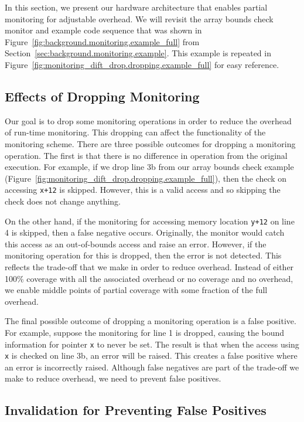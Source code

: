In this section, we present our hardware architecture that enables partial
monitoring for adjustable overhead. We will revisit the array bounds check
monitor and example code sequence that was shown in
Figure~\ref{fig:background.monitoring.example_full} from
Section~\ref{sec:background.monitoring.example}. This example is repeated
in Figure~\ref{fig:monitoring_dift_drop.dropping.example_full} for easy
reference.

\subsection{Effects of Dropping Monitoring}
\label{sec:monitoring_dift_drop.dropping.false_neg_pos}

Our goal is to drop some monitoring operations in order to reduce the overhead
of run-time monitoring. This dropping can affect the functionality of the
monitoring scheme. There are three possible outcomes for dropping a monitoring
operation. The first is that there is no difference in operation from the
original execution. For example, if we drop line 3b from our array bounds check
example (Figure~\ref{fig:monitoring_dift_drop.dropping.example_full}), then the
check on accessing {\tt x+12} is skipped. However, this is a valid access and
so skipping the check does not change anything.

On the other hand, if the monitoring for accessing memory location {\tt y+12}
on line 4 is skipped, then a false negative occurs. Originally, the monitor
would catch this access as an out-of-bounds access and raise an error. However,
if the monitoring operation for this is dropped, then the error is not
detected. This reflects the trade-off that we make in order to reduce overhead.
Instead of either 100\% coverage with all the associated overhead or no
coverage and no overhead, we enable middle points of partial coverage with some
fraction of the full overhead.

The final possible outcome of dropping a monitoring operation is a false
positive.  For example, suppose the monitoring for line 1 is dropped, causing
the bound information for pointer {\tt x} to never be set. The result is that
when the access using {\tt x} is checked on line 3b, an error will be raised.
This creates a false positive where an error is incorrectly raised. Although
false negatives are part of the trade-off we make to reduce overhead, we need
to prevent false positives.

\subsection{Invalidation for Preventing False Positives}
\label{sec:monitoring_dift_drop.dropping.prevent_false_pos}

